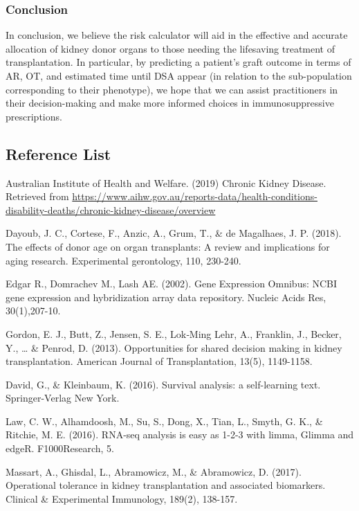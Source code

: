 \documentclass[a4paper,9pt,twocolumn,twoside,]{pinp}
\begin{document}
\hypertarget{conclusion}{%
\subsubsection{Conclusion}\label{conclusion}}

In conclusion, we believe the risk calculator will aid in the effective
and accurate allocation of kidney donor organs to those needing the
lifesaving treatment of transplantation. In particular, by predicting a
patient's graft outcome in terms of AR, OT, and estimated time until DSA
appear (in relation to the sub-population corresponding to their
phenotype), we hope that we can assist practitioners in their
decision-making and make more informed choices in immunosuppressive
prescriptions.

\newpage

\hypertarget{reference-list}{%
\subsection{Reference List}\label{reference-list}}

Australian Institute of Health and Welfare. (2019) Chronic Kidney
Disease. Retrieved from
\url{https://www.aihw.gov.au/reports-data/health-conditions-disability-deaths/chronic-kidney-disease/overview}

Dayoub, J. C., Cortese, F., Anzic, A., Grum, T., \& de Magalhaes, J. P.
(2018). The effects of donor age on organ transplants: A review and
implications for aging research. Experimental gerontology, 110, 230-240.

Edgar R., Domrachev M., Lash AE. (2002). Gene Expression Omnibus: NCBI
gene expression and hybridization array data repository. Nucleic Acids
Res, 30(1),207-10.

Gordon, E. J., Butt, Z., Jensen, S. E., Lok‐Ming Lehr, A., Franklin, J.,
Becker, Y., \ldots{} \& Penrod, D. (2013). Opportunities for shared
decision making in kidney transplantation. American Journal of
Transplantation, 13(5), 1149-1158.

David, G., \& Kleinbaum, K. (2016). Survival analysis: a self-learning
text. Springer-Verlag New York.

Law, C. W., Alhamdoosh, M., Su, S., Dong, X., Tian, L., Smyth, G. K., \&
Ritchie, M. E. (2016). RNA-seq analysis is easy as 1-2-3 with limma,
Glimma and edgeR. F1000Research, 5.

Massart, A., Ghisdal, L., Abramowicz, M., \& Abramowicz, D. (2017).
Operational tolerance in kidney transplantation and associated
biomarkers. Clinical \& Experimental Immunology, 189(2), 138-157.
\end{document}
